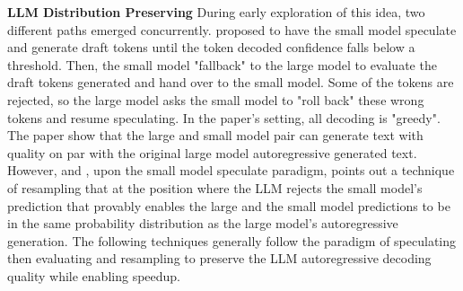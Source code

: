 \textbf{LLM Distribution Preserving} During early exploration of this idea, two different paths emerged concurrently. \cite{kim2023speculative} proposed to have the small model speculate and generate draft tokens until the token decoded confidence falls below a threshold. Then, the small model "fallback" to the large model to evaluate the draft tokens generated and hand over to the small model. Some of the tokens are rejected, so the large model asks the small model to "roll back" these wrong tokens and resume speculating. In the paper's setting, all decoding is "greedy". The paper show that the large and small model pair can generate text with quality on par with the original large model autoregressive generated text. However, \cite{leviathan2023fast} and \cite{chen2023accelerating}, upon the small model speculate paradigm, points out a technique of resampling that at the position where the LLM rejects the small model's prediction that provably enables the large and the small model predictions to be in the same probability distribution as the large model's autoregressive generation. 
The following techniques generally follow the paradigm of speculating then evaluating and resampling to preserve the LLM autoregressive decoding quality while enabling speedup. 

